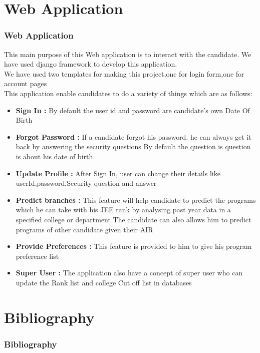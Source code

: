 \documentclass{beamer}
\begin{document}
\section{Web Application}

\begin{frame}
\frametitle{Web Application}
\pause

This main purpose of this Web application is to interact with the candidate. We have used django\cite{django} framework to develop this application.\\
\pause
We have used two templates\cite{temp1}\cite{temp2} for making this project,one for login form,one for account pages\\
\pause
This application enable candidates to do a variety of things which are as follows:
\pause
\begin{itemize}
\item {\bf Sign In : } By default the user id and password are candidate's own Date Of Birth  
\pause
\item {\bf Forgot Password : } If a candidate forgot his password. he can always get it back by answering the security questions
\pause
By default the question is question is about his date of birth 
\end{itemize}
\end{frame}

\begin{frame}
\begin{itemize}
\item {\bf Update Profile :} After Sign In, user can change their details like userId,password,Security question and answer
\pause
\item { \bf Predict branches : } This feature will help candidate to predict the programs which he can take with his JEE rank by analysing past year data in a specified college or department
\pause
The candidate can also allows him to predict programs of other candidate given their AIR
\pause
\item { \bf Provide Preferences : } This feature is provided to him to give his program preference list 
\pause
\item { \bf Super User : } The application also have a concept of super user who can update the Rank list and college Cut off list in databases


\end{itemize}

\end{frame}




\section{Bibliography}
\begin{frame}


\frametitle{Bibliography}
\nocite{*}



\end{frame}
\end{document}
